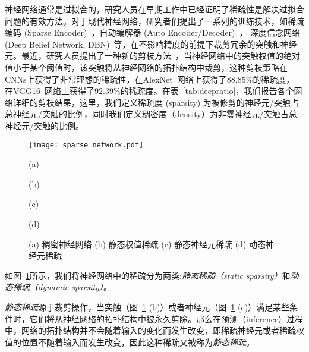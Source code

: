 神经网络通常是过拟合的，研究人员在早期工作中已经证明了稀疏性是解决过拟合问题的有效方法。对于现代神经网络，研究者们提出了一系列的训练技术，如稀疏编码 (Sparse Encoder)~\cite{olshausen1996emergence}，自动编解器 (Auto Encoder/Decoder)~\cite{boureau2008sparse,lee2008sparse}， 深度信念网络 (Deep Belief Network, DBN)~\cite{lee2007efficient}等，在不影响精度的前提下裁剪冗余的突触和神经元。最近，研究人员提出了一种新的剪枝方法~\cite{han2015learning}，当神经网络中的突触权值的绝对值小于某个阈值时，该突触将从神经网络的拓扑结构中裁剪，这种剪枝策略在CNNs上获得了非常理想的稀疏性，在AlexNet~\cite{krizhevsky2012imagenet}网络上获得了$88.85\%$的稀疏度， 在VGG16~\cite{simonyan2014very}网络上获得了$92.39\%$的稀疏度。在表~\ref{tab:deepratio}，我们报告各个网络详细的剪枝结果，这里，我们定义稀疏度 (sparsity) 为被修剪的神经元/突触占总神经元/突触的比例，同时我们定义稠密度（density）为非零神经元/突触占总神经元/突触的比例。


\begin{figure}[h]
  \centering
  \begin{minipage}[t]{\columnwidth}
  \texttt{[image: sparse\_network.pdf]}
  \end{minipage}
  \vfill
  \begin{minipage}[t]{0.24\columnwidth}
      \centering\footnotesize
    (a)
  \end{minipage}
  \hfill
  \begin{minipage}[t]{0.24\columnwidth}
      \centering\footnotesize
    (b)
  \end{minipage}
  \hfill
  \begin{minipage}[t]{0.24\columnwidth}
      \centering\footnotesize
    (c)
  \end{minipage}
    \hfill
  \begin{minipage}[t]{0.24\columnwidth}
      \centering\footnotesize
    (d)
  \end{minipage}
  \caption{ (a) 稠密神经网络 (b) 静态权值稀疏 (c) 静态神经元稀疏 (d) 动态神经元稀疏}
  \label{fig:sparsity}
\end{figure}

如图~\ref{fig:sparsity}所示，我们将神经网络中的稀疏分为两类:\emph{静态稀疏（static sparsity）}和\emph{动态稀疏（dynamic sparsity）}。

\emph{静态稀疏}源于裁剪操作，当突触（图~\ref{fig:sparsity} (b)）或者神经元（图~\ref{fig:sparsity} (c)）满足某些条件时，它们将从神经网络的拓扑结构中被永久剪除。那么在预测（inference）过程中，网络的拓扑结构并不会随着输入的变化而发生改变，即稀疏神经元或者稀疏权值的位置不随着输入而发生改变，因此这种稀疏又被称为\emph{静态稀疏}。

